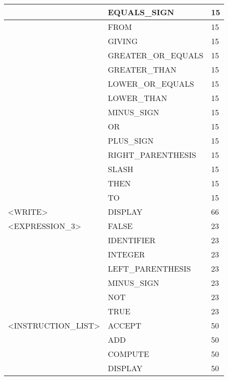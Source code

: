 \begin{longtable}{|l|l|l|}
                     &   EQUALS\_SIGN          &   15 \\ \hline
                     &   FROM                 &   15 \\ \hline
                     &   GIVING               &   15 \\ \hline
                     &   GREATER\_OR\_EQUALS    &   15 \\ \hline
                     &   GREATER\_THAN         &   15 \\ \hline
                     &   LOWER\_OR\_EQUALS      &   15 \\ \hline
                     &   LOWER\_THAN           &   15 \\ \hline
                     &   MINUS\_SIGN           &   15 \\ \hline
                     &   OR                   &   15 \\ \hline
                     &   PLUS\_SIGN            &   15 \\ \hline
                     &   RIGHT\_PARENTHESIS    &   15 \\ \hline
                     &   SLASH                &   15 \\ \hline
                     &   THEN                 &   15 \\ \hline
                     &   TO                   &   15 \\ \hline
<WRITE>              &   DISPLAY              &   66 \\ \hline
<EXPRESSION\_3>       &   FALSE                &   23 \\ \hline
                     &   IDENTIFIER           &   23 \\ \hline
                     &   INTEGER              &   23 \\ \hline
                     &   LEFT\_PARENTHESIS     &   23 \\ \hline
                     &   MINUS\_SIGN           &   23 \\ \hline
                     &   NOT                  &   23 \\ \hline
                     &   TRUE                 &   23 \\ \hline
<INSTRUCTION\_LIST>   &   ACCEPT               &   50 \\ \hline
                     &   ADD                  &   50 \\ \hline
                     &   COMPUTE              &   50 \\ \hline
                     &   DISPLAY              &   50 \\ \hline

\end{longtable}

